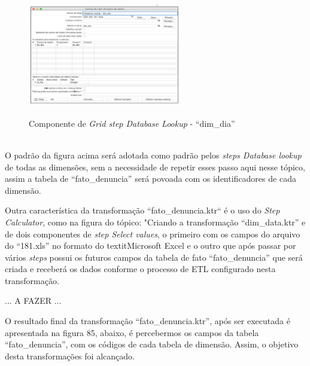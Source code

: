 \begin{figure}[H]
	\vspace*{0,2cm}
    \centering
    \caption{Componente de \textit{Grid step Database Lookup} - ``dim\_dia''}
    \includegraphics[width=0.6\textwidth]{./04-figuras/figura-dl-dim-dia}
    \label{fig:ilustfigdldimdia}
\end{figure}
\vspace*{-0,9cm}
{\raggedright {}} \\

O padr\~{a}o da figura acima ser\'{a} adotada como padr\~{a}o pelos \textit{steps Database lookup} de todas as dimens\~{o}es, sem a necessidade de repetir esses passo aqui nesse t\'opico, assim a tabela de ``fato\_denuncia'' ser\'{a} povoada com os identificadores de cada dimens\~{a}o.

Outra caracter\'{i}stica da transforma\c{c}\~{a}o ``fato\_denuncia.ktr`` \'{e} o uso do \textit{Step Calculator}, como na figura do t\'opico: "Criando a transforma\c{c}\~{a}o ``dim\_data.ktr'' e  de dois componentes de \textit{step Select values}, o primeiro com os campos do arquivo do ``181.xls'' no formato do textit{Microsoft Excel} e o outro que ap\'os passar por v\'{a}rios \textit{steps} possui os futuros campos da tabela de fato 
``fato\_denuncia'' que ser\'{a} criada e receber\'{a} os dados conforme o processo de ETL configurado nesta transforma\c{c}\~{a}o.

... A FAZER ...

O resultado final da transforma\c{c}\~{a}o ``fato\_denuncia.ktr'', ap\'os ser executada \'{e} apresentada na figura 85, abaixo, \'{e} percebermos os campos da tabela ``fato\_denuncia'', com os c\'odigos de cada tabela de dimens\~{a}o.
Assim, o objetivo desta transforma\c{c}\~{o}es foi alcan\c{c}ado.

